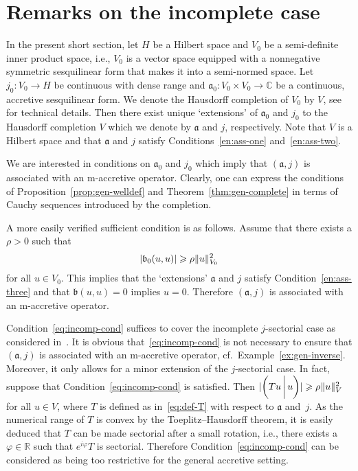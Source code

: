 \documentclass[a4paper,oneside,12pt]{amsart}
\theoremstyle{plain}
\theoremstyle{definition}
\let\ge=\geqslant
\DeclarePairedDelimiter\norm{\lVert}{\rVert}
\DeclarePairedDelimiter\abs{\lvert}{\rvert}
\begin{document}
\section{Remarks on the incomplete case}\label{sec:incomp}

In the present short section, let $H$ be a Hilbert space and $V_0$ be a semi-definite inner product space, i.e., $V_0$ is a vector space
equipped with a nonnegative symmetric sesquilinear form that makes it into a semi-normed space.
Let $j_0\colon V_0\to H$ be continuous with dense range
and ${{\mathfrak{{a}}}}_0\colon V_0\times V_0\to{\mathbb{C}}$ be a continuous, accretive sesquilinear form.
We denote the Hausdorff completion of $V_0$ by $V$, see~\cite[Chapter II, \S3, Theorem~3]{Bou66:top1} for technical details.
Then there exist unique `extensions' of ${{\mathfrak{{a}}}}_0$ and $j_0$ to the Hausdorff completion $V$ which we denote by ${{\mathfrak{{a}}}}$ and $j$, respectively.
Note that $V$ is a Hilbert space and that ${{\mathfrak{{a}}}}$ and $j$ satisfy Conditions~\ref{en:ass-one} and~\ref{en:ass-two}.

We are interested in conditions on ${{\mathfrak{{a}}}}_0$ and $j_0$ which imply that $({{\mathfrak{{a}}}},j)$ is associated with an 
{\ensuremath{\text{m}}}-accretive operator. Clearly, one can express the conditions of Proposition~\ref{prop:gen-welldef} and Theorem~\ref{thm:gen-complete} in terms of Cauchy sequences introduced by
the completion.

A more easily verified sufficient condition is as follows. Assume that there exists a $\rho>0$ such that 
\begin{equation}\label{eq:incomp-cond}
\abs{{{\mathfrak{{b}}}}_0(u,u)}\ge\rho\norm{u}_{V_0}^2
\end{equation}
for all $u\in V_0$.
This implies that the `extensions' ${{\mathfrak{{a}}}}$ and $j$ satisfy Condition~\ref{en:ass-three} and that ${{\mathfrak{{b}}}}(u,u)=0$ implies $u=0$.
Therefore $({{\mathfrak{{a}}}},j)$ is associated with an {\ensuremath{\text{m}}}-accretive operator.

Condition~\eqref{eq:incomp-cond} suffices to cover the incomplete $j$-sectorial case as considered in~\cite[Section~3]{AtE12:sect-form}.
It is obvious that~\eqref{eq:incomp-cond} is not necessary to ensure that $({{\mathfrak{{a}}}},j)$ is associated with an {\ensuremath{\text{m}}}-accretive operator,
cf.~Example~\ref{ex:gen-inverse}.
Moreover, it only allows for a minor extension of the $j$-sectorial case.
In fact, suppose that Condition~\eqref{eq:incomp-cond} is satisfied. Then $\abs{{{\ifthenelse{\equal{auto}{auto}}{\left({Tu}\mkern3mu{\biggm|}\mkern3mu {u}\right)}{}
\ifthenelse{\equal{auto}{b}}{\bigl({Tu}\mkern3mu{\biggm|}\mkern3mu {u}\bigr)}{}
\ifthenelse{\equal{auto}{B}}{\Bigl({Tu}\mkern3mu{\bigm|}\mkern3mu {u}\Bigr)}{}
}}}\ge\rho\norm{u}_V^2$ for all $u\in V$, where $T$ is defined as in~\eqref{eq:def-T} with respect to ${{\mathfrak{{a}}}}$ and~$j$. 
As the numerical range of $T$ is convex by the Toeplitz--Hausdorff theorem, it is easily deduced that $T$ can be made sectorial after a small rotation, i.e., there exists a $\varphi\in{\mathbb{R}}$ such that $e^{i\varphi}T$ is sectorial. 
Therefore Condition~\eqref{eq:incomp-cond} can be considered as being too restrictive for the general accretive setting.
\end{document}
